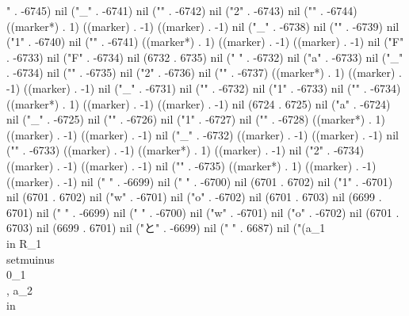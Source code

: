 " . -6745) nil ("_" . -6741) nil ("{" . -6742) nil ("2" . -6743) nil ("}" . -6744) ((marker*) . 1) ((marker) . -1) ((marker) . -1) nil ("_" . -6738) nil ("{" . -6739) nil ("1" . -6740) nil ("}" . -6741) ((marker*) . 1) ((marker) . -1) ((marker) . -1) nil ("F" . -6733) nil ("F" . -6734) nil (6732 . 6735) nil (" " . -6732) nil ("a" . -6733) nil ("_" . -6734) nil ("{" . -6735) nil ("2" . -6736) nil ("}" . -6737) ((marker*) . 1) ((marker) . -1) ((marker) . -1) nil ("_" . -6731) nil ("{" . -6732) nil ("1" . -6733) nil ("}" . -6734) ((marker*) . 1) ((marker) . -1) ((marker) . -1) nil (6724 . 6725) nil ("a" . -6724) nil ("_" . -6725) nil ("{" . -6726) nil ("1" . -6727) nil ("}" . -6728) ((marker*) . 1) ((marker) . -1) ((marker) . -1) nil ("_" . -6732) ((marker) . -1) ((marker) . -1) nil ("{" . -6733) ((marker) . -1) ((marker*) . 1) ((marker) . -1) nil ("2" . -6734) ((marker) . -1) ((marker) . -1) nil ("}" . -6735) ((marker*) . 1) ((marker) . -1) ((marker) . -1) nil ("
" . -6699) nil (" " . -6700) nil (6701 . 6702) nil ("1" . -6701) nil (6701 . 6702) nil ("w" . -6701) nil ("o" . -6702) nil (6701 . 6703) nil (6699 . 6701) nil ("
" . -6699) nil (" " . -6700) nil ("w" . -6701) nil ("o" . -6702) nil (6701 . 6703) nil (6699 . 6701) nil ("と" . -6699) nil ("
" . 6687) nil ("(a_{1}\\in R_{1}\\setmuinus\\{0_{1}\\}, a_{2}\\in
